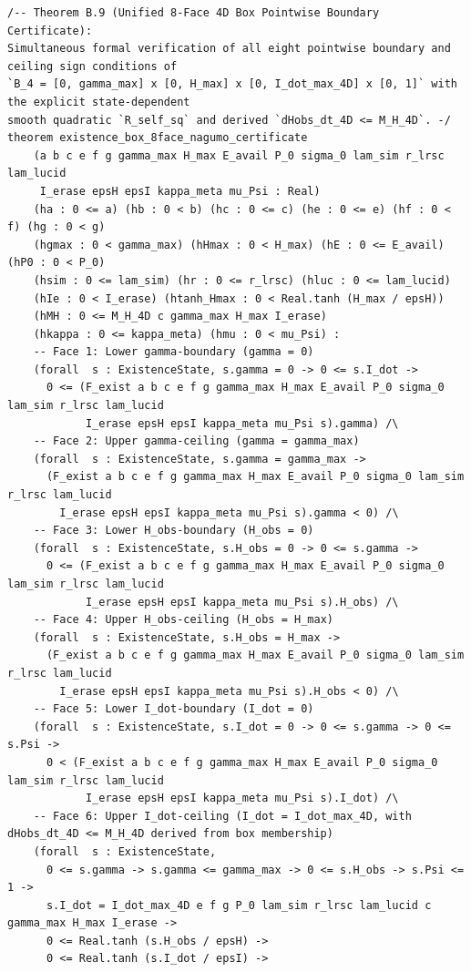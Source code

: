 \documentclass[11pt,a4paper]{article}
\theoremstyle{definition}
\begin{document}
\begin{lstlisting}[language=Lean4]
/-- Theorem B.9 (Unified 8-Face 4D Box Pointwise Boundary Certificate):
Simultaneous formal verification of all eight pointwise boundary and ceiling sign conditions of
`B_4 = [0, gamma_max] x [0, H_max] x [0, I_dot_max_4D] x [0, 1]` with the explicit state-dependent
smooth quadratic `R_self_sq` and derived `dHobs_dt_4D <= M_H_4D`. -/
theorem existence_box_8face_nagumo_certificate
    (a b c e f g gamma_max H_max E_avail P_0 sigma_0 lam_sim r_lrsc lam_lucid
     I_erase epsH epsI kappa_meta mu_Psi : Real)
    (ha : 0 <= a) (hb : 0 < b) (hc : 0 <= c) (he : 0 <= e) (hf : 0 < f) (hg : 0 < g)
    (hgmax : 0 < gamma_max) (hHmax : 0 < H_max) (hE : 0 <= E_avail) (hP0 : 0 < P_0)
    (hsim : 0 <= lam_sim) (hr : 0 <= r_lrsc) (hluc : 0 <= lam_lucid)
    (hIe : 0 < I_erase) (htanh_Hmax : 0 < Real.tanh (H_max / epsH))
    (hMH : 0 <= M_H_4D c gamma_max H_max I_erase)
    (hkappa : 0 <= kappa_meta) (hmu : 0 < mu_Psi) :
    -- Face 1: Lower gamma-boundary (gamma = 0)
    (forall  s : ExistenceState, s.gamma = 0 -> 0 <= s.I_dot ->
      0 <= (F_exist a b c e f g gamma_max H_max E_avail P_0 sigma_0 lam_sim r_lrsc lam_lucid
            I_erase epsH epsI kappa_meta mu_Psi s).gamma) /\
    -- Face 2: Upper gamma-ceiling (gamma = gamma_max)
    (forall  s : ExistenceState, s.gamma = gamma_max ->
      (F_exist a b c e f g gamma_max H_max E_avail P_0 sigma_0 lam_sim r_lrsc lam_lucid
        I_erase epsH epsI kappa_meta mu_Psi s).gamma < 0) /\
    -- Face 3: Lower H_obs-boundary (H_obs = 0)
    (forall  s : ExistenceState, s.H_obs = 0 -> 0 <= s.gamma ->
      0 <= (F_exist a b c e f g gamma_max H_max E_avail P_0 sigma_0 lam_sim r_lrsc lam_lucid
            I_erase epsH epsI kappa_meta mu_Psi s).H_obs) /\
    -- Face 4: Upper H_obs-ceiling (H_obs = H_max)
    (forall  s : ExistenceState, s.H_obs = H_max ->
      (F_exist a b c e f g gamma_max H_max E_avail P_0 sigma_0 lam_sim r_lrsc lam_lucid
        I_erase epsH epsI kappa_meta mu_Psi s).H_obs < 0) /\
    -- Face 5: Lower I_dot-boundary (I_dot = 0)
    (forall  s : ExistenceState, s.I_dot = 0 -> 0 <= s.gamma -> 0 <= s.Psi ->
      0 < (F_exist a b c e f g gamma_max H_max E_avail P_0 sigma_0 lam_sim r_lrsc lam_lucid
            I_erase epsH epsI kappa_meta mu_Psi s).I_dot) /\
    -- Face 6: Upper I_dot-ceiling (I_dot = I_dot_max_4D, with dHobs_dt_4D <= M_H_4D derived from box membership)
    (forall  s : ExistenceState,
      0 <= s.gamma -> s.gamma <= gamma_max -> 0 <= s.H_obs -> s.Psi <= 1 ->
      s.I_dot = I_dot_max_4D e f g P_0 lam_sim r_lrsc lam_lucid c gamma_max H_max I_erase ->
      0 <= Real.tanh (s.H_obs / epsH) ->
      0 <= Real.tanh (s.I_dot / epsI) ->

\end{lstlisting}
\end{document}

